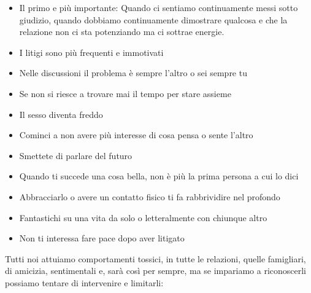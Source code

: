 \documentclass[12pt]{book} %
\begin{document}
\begin{itemize}
\item Il primo e più importante: Quando ci sentiamo continuamente messi sotto giudizio, quando dobbiamo continuamente
dimostrare qualcosa e che la relazione non ci sta potenziando ma ci sottrae energie.
\item I litigi sono più frequenti e immotivati 
\item Nelle discussioni il problema è sempre l'altro o sei sempre tu
\item Se non si riesce a trovare mai il tempo per stare assieme 
\item Il sesso diventa freddo
\item Cominci a non avere più interesse di cosa pensa o sente l'altro
\item Smettete di parlare del futuro
\item Quando ti succede una cosa bella, non è più la prima persona a cui lo dici
\item Abbracciarlo o avere un contatto fisico ti fa rabbrividire nel profondo
\item Fantastichi su una vita da solo o letteralmente con chiunque altro
\item Non ti interessa fare pace dopo aver litigato
\end{itemize}

\bigskip

Tutti noi attuiamo comportamenti tossici, in tutte le relazioni, quelle famigliari, di amicizia, sentimentali e, sarà
così per sempre, ma se impariamo a riconoscerli possiamo tentare di intervenire e
limitarli:
\end{document}
